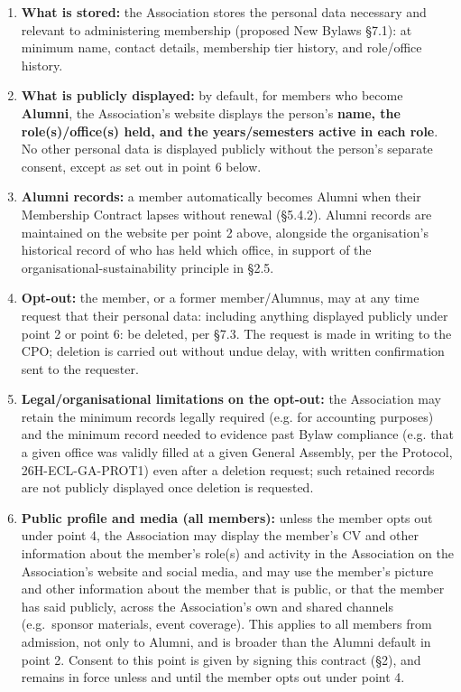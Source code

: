 \documentclass{../../../Common/Latex/Templates/rapport}
\begin{document}
\begin{enumerate}
  \item \textbf{What is stored:} the Association stores the personal data necessary and relevant to administering membership (proposed New Bylaws \S7.1): at minimum name, contact details, membership tier history, and role/office history.
  \item \textbf{What is publicly displayed:} by default, for members who become \textbf{Alumni}, the Association's website displays the person's \textbf{name, the role(s)/office(s) held, and the years/semesters active in each role}. No other personal data is displayed publicly without the person's separate consent, except as set out in point 6 below.
  \item \textbf{Alumni records:} a member automatically becomes Alumni when their Membership Contract lapses without renewal (\S5.4.2). Alumni records are maintained on the website per point 2 above, alongside the organisation's historical record of who has held which office, in support of the organisational-sustainability principle in \S2.5.
  \item \textbf{Opt-out:} the member, or a former member/Alumnus, may at any time request that their personal data: including anything displayed publicly under point 2 or point 6: be deleted, per \S7.3. The request is made in writing to the CPO; deletion is carried out without undue delay, with written confirmation sent to the requester.
  \item \textbf{Legal/organisational limitations on the opt-out:} the Association may retain the minimum records legally required (e.g. for accounting purposes) and the minimum record needed to evidence past Bylaw compliance (e.g. that a given office was validly filled at a given General Assembly, per the Protocol, 26H-ECL-GA-PROT1) even after a deletion request; such retained records are not publicly displayed once deletion is requested.
  \item \textbf{Public profile and media (all members):} unless the member opts out under point 4, the Association may display the member's CV and other information about the member's role(s) and activity in the Association on the Association's website and social media, and may use the member's picture and other information about the member that is public, or that the member has said publicly, across the Association's own and shared channels (e.g.\ sponsor materials, event coverage). This applies to all members from admission, not only to Alumni, and is broader than the Alumni default in point 2. Consent to this point is given by signing this contract (\S2), and remains in force unless and until the member opts out under point 4.
\end{enumerate}
\end{document}

